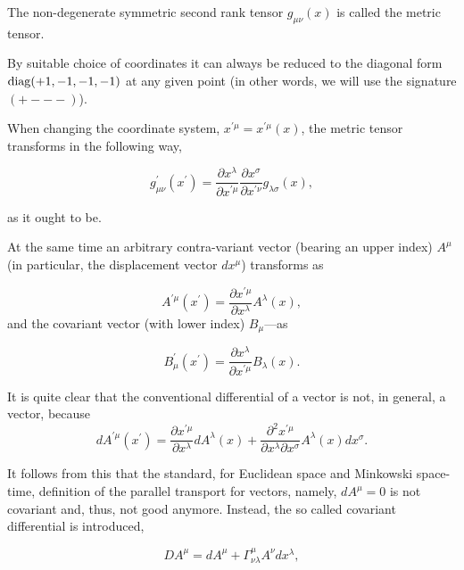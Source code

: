 The non-degenerate symmetric second rank tensor $g_{\mu \nu} (x)$ is called the metric tensor. 

By suitable choice of coordinates it can always be reduced to the diagonal form $\mathop{\rm diag} (+1, -1, -1, -1)$ at any given point (in other words, we will use the signature $( + - - - )$). 

When changing the coordinate system, $x^{\prime \mu}= x^{\prime \mu}(x)$, the metric tensor transforms in the following way, 

$$

g^{\prime}_{\mu \nu} (x^{\prime}) = \frac{\partial x^{\lambda}}{\partial x^{\prime \mu}} \frac{\partial x^{\sigma}}{\partial x^{\prime \nu}} g_{\lambda \sigma} (x),

$$ 

as it ought to be. 

At the same time an arbitrary contra-variant vector (bearing an upper index) $A^{\mu}$ (in particular, the displacement vector $dx^{\mu}$) transforms as 

$$

A^{\prime \mu} (x^{\prime}) = \frac{\partial x^{\prime \mu}}{\partial x^{\lambda}} A^{\lambda} (x),

$$ and the covariant vector (with lower index) $B_{\mu}$---as 

$$

B^{\prime}_{\mu}(x^{\prime}) = \frac{\partial x^{\lambda}}{\partial x^{\prime \mu}}B_{\lambda} (x).

$$ 

It is quite clear that the conventional differential of a vector is not, in general, a vector, because  $$

d A^{\prime \mu} (x^{\prime}) = \frac{\partial x^{\prime \mu}}{\partial x^{\lambda}} d A^{\lambda}

(x) + \frac{\partial ^2 x^{\prime \mu}}{\partial x^{\lambda}\partial x^{\sigma}} A^{\lambda} (x) d x^{\sigma}.

$$ 

It follows from this that the standard, for Euclidean space and Minkowski space-time, definition of the parallel transport for vectors, namely, $dA^{\mu} = 0$ is not covariant and, thus, not good anymore. Instead, the so called covariant differential is introduced, 

$$

DA^{\mu} = dA^{\mu} + \Gamma^{\mu}_{\nu \lambda} A^{\nu} dx^{\lambda},

$$ 

